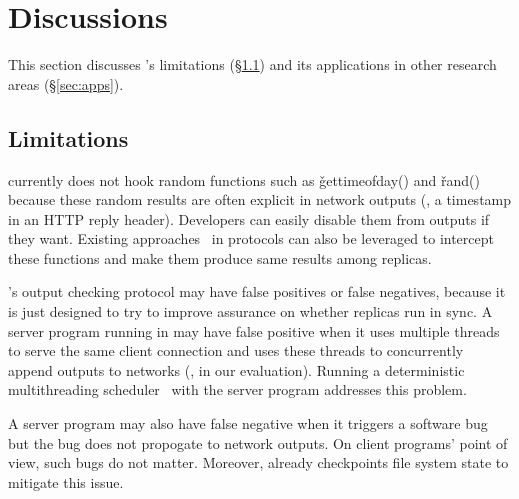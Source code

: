 \section{Discussions}\label{sec:discuss}
% 
This section discusses \xxx's limitations (\S\ref{sec:limits}) and its 
applications in other research areas (\S\ref{sec:apps}).

\subsection{Limitations}\label{sec:limits}


\xxx currently does not hook random functions such as \v{gettimeofday()} and 
\v{rand()} because these random results are often explicit in network outputs 
(\eg, a timestamp in an HTTP reply header). Developers can easily disable them 
from outputs if they want. Existing 
approaches~\cite{eve:osdi12,paxos:practical} in \paxos protocols can also be 
leveraged to intercept these functions and make them produce same results among 
replicas.


\xxx's output checking protocol may have false positives or false negatives, 
because it is just designed to try to improve assurance on whether replicas run 
in sync. A server program running in \xxx may have false positive when it uses 
multiple threads to serve the same client connection and uses these threads to 
concurrently append outputs to networks (\eg, \clamav in our evaluation). 
Running a deterministic multithreading 
scheduler~\cite{coredet:asplos10,parrot:sosp13} with the server program 
addresses this problem.

A server program may also have false negative when it triggers a software bug 
but the bug does not propogate to network outputs. On client programs' point of 
view, such bugs do not matter. Moreover, \xxx already checkpoints file system 
state to mitigate this issue.


